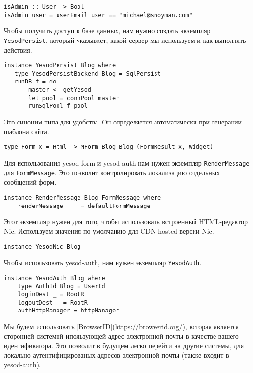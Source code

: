 \begin{lstlisting}
isAdmin :: User -> Bool
isAdmin user = userEmail user == "michael@snoyman.com"
\end{lstlisting}
 
Чтобы получить доступ к базе данных, нам нужно создать экземпляр \lstinline!YesodPersist!, который указывaет, какой сервер мы используем и как выполнять действия. 
 
\begin{lstlisting}
instance YesodPersist Blog where
   type YesodPersistBackend Blog = SqlPersist
   runDB f = do 
       master <- getYesod
       let pool = connPool master
       runSqlPool f pool
\end{lstlisting}
 
Это синоним типа для удобства. Он определяется автоматически при генерации шаблона сайта. 
 
\begin{lstlisting}
type Form x = Html -> MForm Blog Blog (FormResult x, Widget)
\end{lstlisting}
 
Для использования yesod-form и yesod-auth нам нужен экземпляр \lstinline!RenderMessage! для \lstinline!FormMessage!. Это позволит контролировать локализацию отдельных сообщений форм. 
 
\begin{lstlisting}
instance RenderMessage Blog FormMessage where
    renderMessage _ _ = defaultFormMessage
\end{lstlisting}
 
Этот экземпляр нужен для того, чтобы использовать встроенный HTML-редактор Nic. Используем значения по умолчанию для CDN-hosted версии Nic.
 
\begin{lstlisting}
instance YesodNic Blog
\end{lstlisting}
 
Чтобы использовать yesod-auth, нам нужен экземпляр \lstinline!YesodAuth!. 
 
\begin{lstlisting}
instance YesodAuth Blog where
    type AuthId Blog = UserId
    loginDest _ = RootR
    logoutDest _ = RootR
    authHttpManager = httpManager
\end{lstlisting}
 
Мы будем использовать [BrowserID](https://browserid.org/), которая является сторонней системой ипользующей адрес электронной почты в качестве вашего идентификатора. Это позволит в будущем легко перейти на другие системы, для локально аутентифицированых адресов электронной почты (также входит в yesod-auth). 
 
